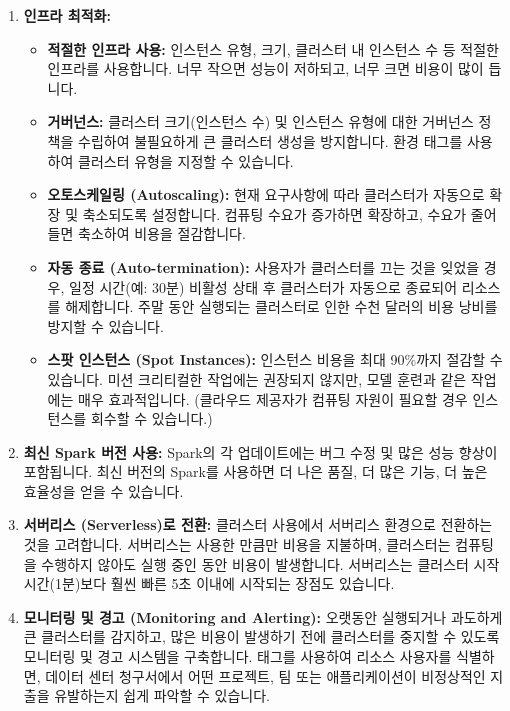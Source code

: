 \documentclass[11pt,a4paper]{article}
\begin{document}
\begin{enumerate}
    \item \textbf{인프라 최적화:}
    \begin{itemize}
        \item \textbf{적절한 인프라 사용:} 인스턴스 유형, 크기, 클러스터 내 인스턴스 수 등 적절한 인프라를 사용합니다. 너무 작으면 성능이 저하되고, 너무 크면 비용이 많이 듭니다.
        \item \textbf{거버넌스:} 클러스터 크기(인스턴스 수) 및 인스턴스 유형에 대한 거버넌스 정책을 수립하여 불필요하게 큰 클러스터 생성을 방지합니다. 환경 태그를 사용하여 클러스터 유형을 지정할 수 있습니다.
        \item \textbf{오토스케일링 (Autoscaling):} 현재 요구사항에 따라 클러스터가 자동으로 확장 및 축소되도록 설정합니다. 컴퓨팅 수요가 증가하면 확장하고, 수요가 줄어들면 축소하여 비용을 절감합니다.
        \item \textbf{자동 종료 (Auto-termination):} 사용자가 클러스터를 끄는 것을 잊었을 경우, 일정 시간(예: 30분) 비활성 상태 후 클러스터가 자동으로 종료되어 리소스를 해제합니다. 주말 동안 실행되는 클러스터로 인한 수천 달러의 비용 낭비를 방지할 수 있습니다.
        \item \textbf{스팟 인스턴스 (Spot Instances):} 인스턴스 비용을 최대 90\%까지 절감할 수 있습니다. 미션 크리티컬한 작업에는 권장되지 않지만, 모델 훈련과 같은 작업에는 매우 효과적입니다. (클라우드 제공자가 컴퓨팅 자원이 필요할 경우 인스턴스를 회수할 수 있습니다.)
    \end{itemize}

    \item \textbf{최신 Spark 버전 사용:}
    Spark의 각 업데이트에는 버그 수정 및 많은 성능 향상이 포함됩니다. 최신 버전의 Spark를 사용하면 더 나은 품질, 더 많은 기능, 더 높은 효율성을 얻을 수 있습니다.

    \item \textbf{서버리스 (Serverless)로 전환:}
    클러스터 사용에서 서버리스 환경으로 전환하는 것을 고려합니다. 서버리스는 사용한 만큼만 비용을 지불하며, 클러스터는 컴퓨팅을 수행하지 않아도 실행 중인 동안 비용이 발생합니다. 서버리스는 클러스터 시작 시간(1분)보다 훨씬 빠른 5초 이내에 시작되는 장점도 있습니다.

    \item \textbf{모니터링 및 경고 (Monitoring and Alerting):}
    오랫동안 실행되거나 과도하게 큰 클러스터를 감지하고, 많은 비용이 발생하기 전에 클러스터를 중지할 수 있도록 모니터링 및 경고 시스템을 구축합니다. 태그를 사용하여 리소스 사용자를 식별하면, 데이터 센터 청구서에서 어떤 프로젝트, 팀 또는 애플리케이션이 비정상적인 지출을 유발하는지 쉽게 파악할 수 있습니다.
\end{enumerate}
\end{document}

